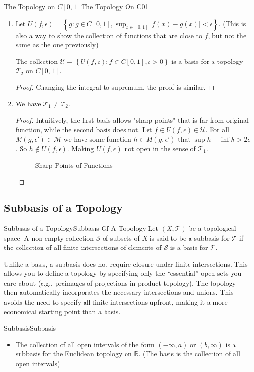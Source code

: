 \documentclass[../main.tex]{subfiles}
\begin{document}
\begin{example}{The Topology on $C[0,1]$}{The Topology On C01}
\begin{enumerate}
\item Let $U(f,\epsilon) = \left\{ g: g\in C[0,1], \sup_{x\in [0,1]}\left|f(x)-g(x)\right|<\epsilon \right\}$. (This is also a way to show the collection of functions that are close to $f$, but not the same as the one previously)

	The collection $\mathcal{U} = \left\{ U(f,\epsilon): f\in C[0,1], \epsilon >0  \right\}$ is a basis for a topology $\mathcal{T}_2$ on $C[0,1]$.
	\begin{proof}
	Changing the integral to supremum, the proof is similar.
	\end{proof}
\item We have $\mathcal{T}_1\neq \mathcal{T}_2$.
	\begin{proof}
		Intuitively, the first basis allows "sharp points" that is far from original function, while the second basis does not. Let $f\in U(f,\epsilon)\in \mathcal{U}$. For all $M(g,\epsilon')\in \mathcal{M}$ we have some function $h\in M(g,\epsilon')$ that $\sup h - \inf h > 2 \epsilon$. So $h\notin U(f,\epsilon)$. Making $U(f,\epsilon)$ not open in the sense of $\mathcal{T}_1$.
\begin{figure}[H]
    \centering
    \caption{Sharp Points of Functions}
    \label{fig:sharp-points-of-functions}
\end{figure}
	\end{proof}
\end{enumerate}
\end{example}


\subsection{Subbasis of a Topology}
\begin{definition}{Subbasis of a Topology}{Subbasis Of A Topology}
	Let $(X,\mathcal{T})$ be a topological space. A non-empty collection $\mathcal{S}$ of subsets of $X$ is said to be a subbasis for $\mathcal{T}$ if the collection of all finite intersections of elements of $\mathcal{S}$ is a basis for $\mathcal{T}$.
\end{definition}
\begin{remark}
Unlike a basis, a subbasis does not require closure under finite intersections. This allows you to define a topology by specifying only the ``essential'' open sets you care about (e.g., preimages of projections in product topology). The topology then automatically incorporates the necessary intersections and unions. This avoids the need to specify all finite intersections upfront, making it a more economical starting point than a basis.
\end{remark}

\begin{example}{Subbasis}{Subbasis}
\begin{itemize}
	\item The collection of all open intervals of the form $(-\infty ,a)$ or $(b,\infty )$ is a subbasis for the Euclidean topology on $\mathbb{R}$. (The basis is the collection of all open intervals)
\end{itemize}
\end{example}
\end{document}
